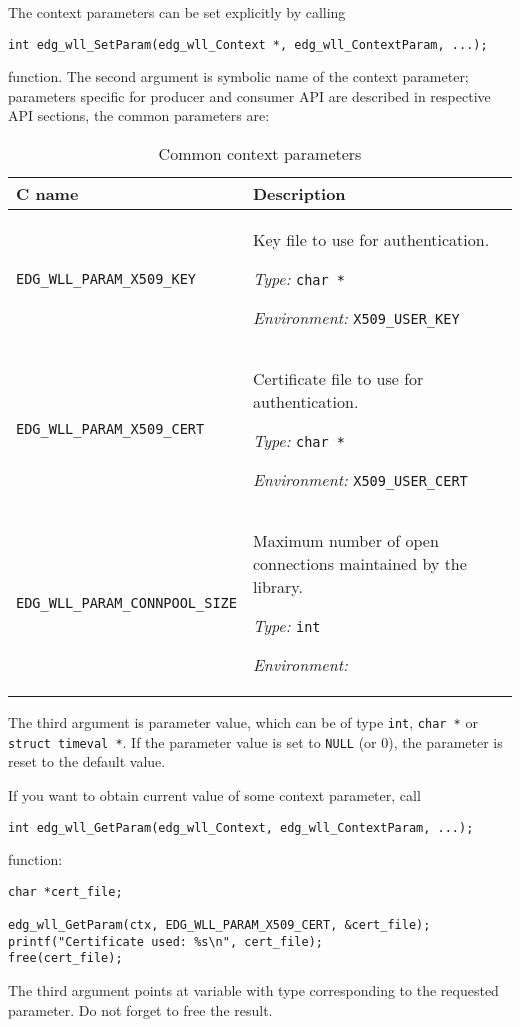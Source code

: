 %
The context parameters can be set explicitly by calling
\begin{lstlisting}
int edg_wll_SetParam(edg_wll_Context *, edg_wll_ContextParam, ...);
\end{lstlisting}
function. The second argument is symbolic name of the context
parameter; parameters specific for producer and consumer API are
described in respective API sections, the common parameters are:

\begin{table}[h]
\begin{tabularx}{\textwidth}{lX}
{\bf C name} & {\bf Description} \\
\hline
\lstinline'EDG_WLL_PARAM_X509_KEY' &
Key file to use for authentication.
\par {\it Type: } \lstinline'char *'
\par {\it Environment: } \lstinline'X509_USER_KEY'
\\
\lstinline'EDG_WLL_PARAM_X509_CERT' &
Certificate file to use for authentication.
\par {\it Type: } \lstinline'char *'
\par {\it Environment: } \lstinline'X509_USER_CERT'
\\
\lstinline'EDG_WLL_PARAM_CONNPOOL_SIZE' &
Maximum number of open connections maintained by the library.
\par {\it Type: } \lstinline'int'
\par {\it Environment: } \\
\end{tabularx}
\caption{Common context parameters}
\label{t:cparam}
\end{table}

The third argument is parameter value, which can be of type
\verb'int', \verb'char *' or \verb'struct timeval *'.
If the parameter value is set to \verb'NULL' (or 0), the
parameter is reset to the default value.

If you want to obtain current value of some context parameter, call
\begin{lstlisting}
int edg_wll_GetParam(edg_wll_Context, edg_wll_ContextParam, ...);
\end{lstlisting}
function:
\begin{lstlisting}
char *cert_file;

edg_wll_GetParam(ctx, EDG_WLL_PARAM_X509_CERT, &cert_file);
printf("Certificate used: %s\n", cert_file);
free(cert_file);
\end{lstlisting}
The third argument points at variable with type corresponding to the
requested parameter. Do not forget to free the result.

